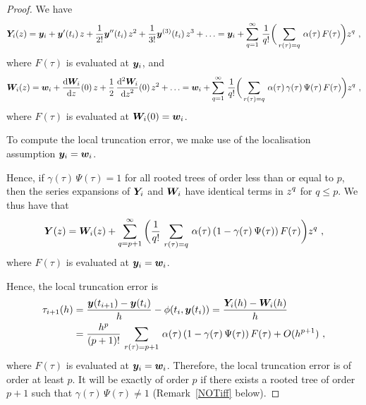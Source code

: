 \begin{proof}
We have
\[
\bm{Y}_i(z) = \bm{y}_i + \bm{y}'(t_i) \,z +
\frac{1}{2!}\bm{y}''(t_i) \, z^2 +
\frac{1}{3!}\bm{y}^{(3)}(t_i) \, z^3 + \ldots 
= \bm{y}_i + \sum_{q=1}^\infty\,\frac{1}{q!}\bigg(
\sum_{r(\tau)=q}\,\alpha(\tau)\,F(\tau) \bigg) z^q \ ,
\]
where $F(\tau)$ is evaluated at $\bm{y}_i$,
and
\[
\bm{W}_i(z) = \bm{w}_i + \frac{\mathrm{d}\bm{W}_i}{\mathrm{d}{z}}(0) \,z +
\frac{1}{2}\,\displaystyle \frac{\mathrm{d}^{2}{\bm{W}_i}} {\displaystyle \mathrm{d}{z}^{2}}(0) \,z^2 + \ldots
= \bm{w}_i + \sum_{q=1}^\infty\,\frac{1}{q!}\bigg(
\sum_{r(\tau)=q}\,\alpha(\tau)\,\gamma(\tau)\,\Psi(\tau)\,F(\tau)
\bigg) z^q  \ ,
\]
where $F(\tau)$ is evaluated at $\bm{W}_i(0) = \bm{w}_i$.

To compute the local truncation error, we make use of the localisation
assumption $\bm{y}_i = \bm{w}_i$.

Hence, if $\gamma(\tau)\,\Psi(\tau) = 1$ for all rooted trees of order
less than or equal to $p$, then the series expansions of $\bm{Y}_i$
and $\bm{W}_i$ have identical terms in $\displaystyle z^q$ for $q\leq p$.
We thus have that
\[
\bm{Y}(z) = \bm{W}_i(z) + \sum_{q=p+1}^\infty\bigg(
\frac{1}{q!}\,\sum_{r(\tau)=q}\,\alpha(\tau) \left( 1
-\gamma(\tau)\,\Psi(\tau) \right)F(\tau)\bigg) z^q \ ,
\]
where $F(\tau)$ is evaluated at $\bm{y}_i = \bm{w}_i$.

Hence, the local truncation error is
\begin{equation}\label{TreeTruncErr}
\begin{split}
\tau_{i+1}(h) &=
\frac{\bm{y}(t_{i+1}) - \bm{y}(t_i)}{h} - \phi(t_i,\bm{y}(t_i))
= \frac{\bm{Y}_i(h) - \bm{W}_i(h)}{h} \\
& = \frac{h^p}{(p+1)!}\,\sum_{r(\tau)=p+1}\,\alpha(\tau) \left( 1
-\gamma(\tau)\,\Psi(\tau) \right)F(\tau) + O(h^{p+1}) \ ,
\end{split}
\end{equation}
where $F(\tau)$ is evaluated at $\bm{y}_i = \bm{w}_i$.
Therefore, the local truncation error is of order at least $p$.  It
will be exactly of order $p$ if there exists a rooted tree of order
$p+1$ such that $\gamma(\tau)\,\Psi(\tau) \not= 1$
(Remark~\ref{NOTiff} below).
\end{proof}


